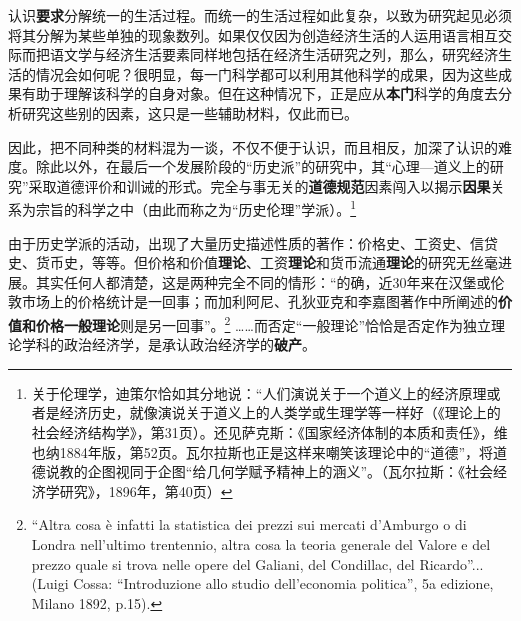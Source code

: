 \documentclass[fontset=fandol, a4paper, 12pt, openright]{ctexbook}
\begin{document}
认识\textbf{要求}分解统一的生活过程。而统一的生活过程如此复杂，以致为研究起见必须将其分解为某些单独的现象数列。如果仅仅因为创造经济生活的人运用语言相互交际而把语文学与经济生活要素同样地包括在经济生活研究之列，那么，研究经济生活的情况会如何呢？很明显，每一门科学都可以利用其他科学的成果，因为这些成果有助于理解该科学的自身对象。但在这种情况下，正是应从\textbf{本门}科学的角度去分析研究这些别的因素，这只是一些辅助材料，仅此而已。

因此，把不同种类的材料混为一谈，不仅不便于认识，而且相反，加深了认识的难度。除此以外，在最后一个发展阶段的“历史派”的研究中，其“心理—道义上的研究”采取道德评价和训诫的形式。完全与事无关的\textbf{道德规范}因素闯入以揭示\textbf{因果}关系为宗旨的科学之中（由此而称之为“历史伦理”学派）。\footnote{关于伦理学，迪策尔恰如其分地说：“人们演说关于一个道义上的经济原理或者是经济历史，就像演说关于道义上的人类学或生理学等一样好（《理论上的社会经济结构学》，第31页）。还见萨克斯：《国家经济体制的本质和责任》，维也纳1884年版，第52页。瓦尔拉斯也正是这样来嘲笑该理论中的“道德”，将道德说教的企图视同于企图“给几何学赋予精神上的涵义”。（瓦尔拉斯：《社会经济学研究》，1896年，第40页）}

由于历史学派的活动，出现了大量历史描述性质的著作：价格史、工资史、信贷史、货币史，等等。但价格和价值\textbf{理论}、工资\textbf{理论}和货币流通\textbf{理论}的研究无丝毫进展。其实任何人都清楚，这是两种完全不同的情形：“的确，近30年来在汉堡或伦敦市场上的价格统计是一回事；而加利阿尼、孔狄亚克和李嘉图著作中所阐述的\textbf{价值和价格一般理论}则是另一回事”。\footnote{``Altra cosa \`{e} infatti la statistica dei prezzi sui mercati d'Amburgo o di Londra nell'ultimo trentennio, altra cosa la teoria generale del Valore e del prezzo quale si trova nelle opere del Galiani, del Condillac, del Ricardo''... (Luigi Cossa: ``Introduzione allo studio dell'economia politica'', 5a edizione, Milano 1892, p.15).} ……而否定“一般理论”恰恰是否定作为独立理论学科的政治经济学，是承认政治经济学的\textbf{破产}。
\end{document}
